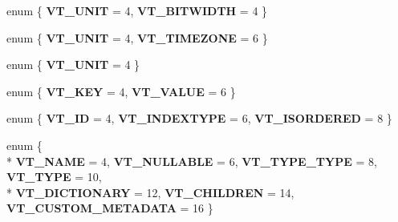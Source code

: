 \begin{DoxyCompactItemize}
\item 
enum \{ {\bfseries V\+T\+\_\+\+U\+N\+IT} = 4, 
{\bfseries V\+T\+\_\+\+B\+I\+T\+W\+I\+D\+TH} = 4
 \}\hypertarget{structorg_1_1apache_1_1arrow_1_1flatbuf_1_1FLATBUFFERS__FINAL__CLASS_a56b3587010912c5568bbaf22f0768d1a}{}\label{structorg_1_1apache_1_1arrow_1_1flatbuf_1_1FLATBUFFERS__FINAL__CLASS_a56b3587010912c5568bbaf22f0768d1a}

\item 
enum \{ {\bfseries V\+T\+\_\+\+U\+N\+IT} = 4, 
{\bfseries V\+T\+\_\+\+T\+I\+M\+E\+Z\+O\+NE} = 6
 \}\hypertarget{structorg_1_1apache_1_1arrow_1_1flatbuf_1_1FLATBUFFERS__FINAL__CLASS_a9610420d24fea561c9cae2cca1801c9a}{}\label{structorg_1_1apache_1_1arrow_1_1flatbuf_1_1FLATBUFFERS__FINAL__CLASS_a9610420d24fea561c9cae2cca1801c9a}

\item 
enum \{ {\bfseries V\+T\+\_\+\+U\+N\+IT} = 4
 \}\hypertarget{structorg_1_1apache_1_1arrow_1_1flatbuf_1_1FLATBUFFERS__FINAL__CLASS_a95f72a75f30a884e50852919b2aefeb1}{}\label{structorg_1_1apache_1_1arrow_1_1flatbuf_1_1FLATBUFFERS__FINAL__CLASS_a95f72a75f30a884e50852919b2aefeb1}

\item 
enum \{ {\bfseries V\+T\+\_\+\+K\+EY} = 4, 
{\bfseries V\+T\+\_\+\+V\+A\+L\+UE} = 6
 \}\hypertarget{structorg_1_1apache_1_1arrow_1_1flatbuf_1_1FLATBUFFERS__FINAL__CLASS_aebf032e0c741c2e797a49644603fd0c7}{}\label{structorg_1_1apache_1_1arrow_1_1flatbuf_1_1FLATBUFFERS__FINAL__CLASS_aebf032e0c741c2e797a49644603fd0c7}

\item 
enum \{ {\bfseries V\+T\+\_\+\+ID} = 4, 
{\bfseries V\+T\+\_\+\+I\+N\+D\+E\+X\+T\+Y\+PE} = 6, 
{\bfseries V\+T\+\_\+\+I\+S\+O\+R\+D\+E\+R\+ED} = 8
 \}\hypertarget{structorg_1_1apache_1_1arrow_1_1flatbuf_1_1FLATBUFFERS__FINAL__CLASS_aba8bd87c794363e09a885bb2082bad86}{}\label{structorg_1_1apache_1_1arrow_1_1flatbuf_1_1FLATBUFFERS__FINAL__CLASS_aba8bd87c794363e09a885bb2082bad86}

\item 
enum \{ \\*
{\bfseries V\+T\+\_\+\+N\+A\+ME} = 4, 
{\bfseries V\+T\+\_\+\+N\+U\+L\+L\+A\+B\+LE} = 6, 
{\bfseries V\+T\+\_\+\+T\+Y\+P\+E\+\_\+\+T\+Y\+PE} = 8, 
{\bfseries V\+T\+\_\+\+T\+Y\+PE} = 10, 
\\*
{\bfseries V\+T\+\_\+\+D\+I\+C\+T\+I\+O\+N\+A\+RY} = 12, 
{\bfseries V\+T\+\_\+\+C\+H\+I\+L\+D\+R\+EN} = 14, 
{\bfseries V\+T\+\_\+\+C\+U\+S\+T\+O\+M\+\_\+\+M\+E\+T\+A\+D\+A\+TA} = 16
 \}\hypertarget{structorg_1_1apache_1_1arrow_1_1flatbuf_1_1FLATBUFFERS__FINAL__CLASS_ac6657967ff9346865d7992b4d9dfc1be}{}\label{structorg_1_1apache_1_1arrow_1_1flatbuf_1_1FLATBUFFERS__FINAL__CLASS_ac6657967ff9346865d7992b4d9dfc1be}


\end{DoxyCompactItemize}
